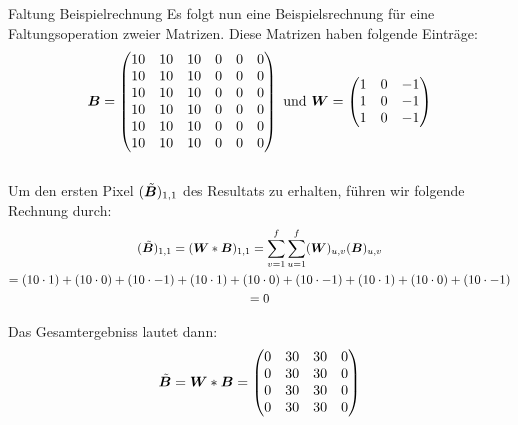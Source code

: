 \begin{examplebox}{Faltung Beispielrechnung}
  Es folgt nun eine Beispielsrechnung für eine Faltungsoperation zweier Matrizen.
  Diese Matrizen haben folgende Einträge:
  \\
  \begin{equation*}
    \bm{B} =
    \begin{pmatrix}
      10 & 10 & 10 & 0 & 0 & 0 \\
      10 & 10 & 10 & 0 & 0 & 0 \\
      10 & 10 & 10 & 0 & 0 & 0 \\
      10 & 10 & 10 & 0 & 0 & 0 \\
      10 & 10 & 10 & 0 & 0 & 0 \\
      10 & 10 & 10 & 0 & 0 & 0 \\
    \end{pmatrix}
    \text{ und } \bm{W} =
    \begin{pmatrix}
      1 & 0 & -1 \\
      1 & 0 & -1 \\
      1 & 0 & -1 \\
    \end{pmatrix}
  \end{equation*}
  \\
  Um den ersten Pixel $(\tilde{\bm{B}})_{1,1}$ des Resultats zu erhalten, führen wir folgende Rechnung durch:
  \begin{gather*}
    (\tilde{\bm{B}})_{1,1} = (\bm{W} * \bm{B})_{1,1} = \sum_{v=1}^{f} \sum_{u=1}^{f} (\bm{W})_{u,v} (\bm{B})_{u,v} \\
                           = (10 \cdot 1) + (10 \cdot 0) + (10 \cdot -1) + (10 \cdot 1) + (10 \cdot 0) + (10 \cdot -1) + (10 \cdot 1) + (10 \cdot 0) + (10 \cdot -1) \\
                           = 0
  \end{gather*}

  Das Gesamtergebniss lautet dann:
  \begin{equation*}
    \tilde{\bm{B}} = \bm{W} * \bm{B} =
    \begin{pmatrix}
      0 & 30 & 30 & 0 \\
      0 & 30 & 30 & 0 \\
      0 & 30 & 30 & 0 \\
      0 & 30 & 30 & 0 \\
    \end{pmatrix}
  \end{equation*}
\end{examplebox}
